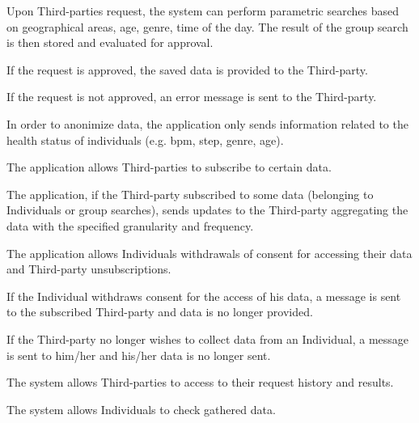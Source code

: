 \begin{enumerate}[label={[}R1.\arabic*{]}, leftmargin=*]
    \item \label{R1-group-requests} Upon Third-parties request, the system can perform parametric searches based on geographical areas, age, genre, time of the day. The result of the group search is then stored and evaluated for approval.
    \begin{enumerate}[label={[}R1.\arabic{enumi}.\arabic*{]}, leftmargin=*]
        \item \label{R1-group-req-approuved} If the request is approved, the saved data is provided to the Third-party.
        \item \label{R1-group-request-refused} If the request is not approved, an error message is sent to the Third-party.
        \item \label{R1-group-data-anonymized} In order to anonimize data, the application only sends information related to the health status of individuals (e.g. bpm, step, genre, age).
    \end{enumerate}
        
    \item \label{R1-third-party-subscription} The application allows Third-parties to subscribe to certain data.
    \begin{enumerate}[label={[}R1.\arabic{enumi}.\arabic*{]}, leftmargin=*]
        \item \label{R1-subscription-updates} The application, if the Third-party subscribed to some data (belonging to Individuals or group searches), sends updates to the Third-party aggregating the data with the specified granularity and frequency.
    \end{enumerate}
        
    \item \label{R1-unsubscription} The application allows Individuals withdrawals of consent for accessing their data and Third-party unsubscriptions.
    \begin{enumerate}[label={[}R1.\arabic{enumi}.\arabic*{]}, leftmargin=*]
        \item \label{R1-Individual-unsubscription} If the Individual withdraws consent for the access of his data, a message is sent to the subscribed Third-party and data is no longer provided.
        \item \label{R1-third-party-unsubscription} If the Third-party no longer wishes to collect data from an Individual, a message is sent to him/her and his/her data is no longer sent.
    \end{enumerate}
        
        
    \item \label{R1-history-request} The system allows Third-parties to access to their request history and results.
    
    \item \label{R1-individual-personal-data} The system allows Individuals to check gathered data.

\end{enumerate}


